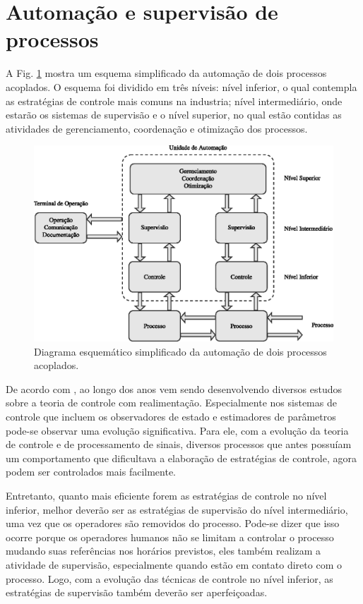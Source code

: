 \section{Automação e supervisão de processos}
A Fig. \ref{fig:esquema_automacao} mostra um esquema simplificado da automação
de dois processos acoplados. O esquema foi dividido em três níveis: nível
inferior, o qual contempla as estratégias de controle mais comuns na industria;
nível intermediário, onde estarão os sistemas de supervisão e o nível superior,
no qual estão contidas as atividades de gerenciamento, coordenação e otimização
dos processos.

\begin{figure}[!htb]
\centering
    \includegraphics{imgs/introducao/eps/esquema_automacao}
    \caption{Diagrama esquemático simplificado da automação de dois processos
             acoplados.}
    \label{fig:esquema_automacao}
\end{figure}

De acordo com , ao longo dos anos vem sendo
desenvolvendo diversos estudos sobre a teoria de controle com realimentação.
Especialmente nos sistemas de controle que incluem os observadores de estado e
estimadores de parâmetros pode-se observar uma evolução significativa. Para ele,
com a evolução da teoria de controle e de processamento de sinais, diversos
processos que antes possuíam um comportamento que dificultava a elaboração de
estratégias de controle, agora podem ser controlados mais facilmente.

Entretanto, quanto mais eficiente forem as estratégias de controle no nível
inferior, melhor deverão ser as estratégias de supervisão do nível
intermediário, uma vez que os operadores são removidos do processo. Pode-se
dizer que isso ocorre porque os operadores humanos não se limitam a controlar o
processo mudando suas referências nos horários previstos, eles também realizam
a atividade de supervisão, especialmente quando estão em contato direto com o
processo. Logo, com a evolução das técnicas de controle no nível inferior, as
estratégias de supervisão também deverão ser aperfeiçoadas.

